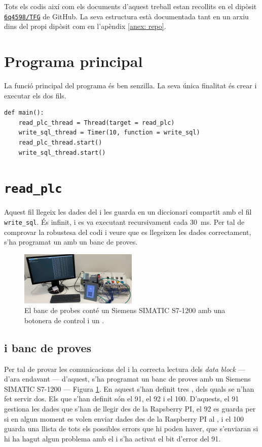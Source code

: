 \documentclass{tfgitic}[2022/06/30]
\begin{document}
Tots els codis així com els documents d'aquest treball estan recollits en el dipòsit \texttt{\href{https://github.com/6q4598/TFG}{6q4598/TFG}} de GitHub. La seva estructura està documentada tant en un arxiu  dins del propi dipòsit com en l'apèndix \ref{anex: repo}.

\section{Programa principal}
La funció principal del programa és ben senzilla. La seva única finalitat és crear i executar els dos fils.

\begin{lstlisting}[style=Python]
def main():
    read_plc_thread = Thread(target = read_plc)
    write_sql_thread = Timer(10, function = write_sql)
    read_plc_thread.start()
    write_sql_thread.start()
\end{lstlisting}

\section{\texttt{read\_plc}}
Aquest fil llegeix les dades del  i les guarda en un diccionari compartit amb el fil \texttt{write\_sql}. És infinit, i es va executant recursivament cada \SI{30}{\ms}. Per tal de comprovar la robustesa del codi i veure que es llegeixen les dades correctament, s'ha programat un  amb un banc de proves.

\begin{figure}[h]
\centering
\includegraphics[width=0.5\textwidth]{img/bancProves.jpg}
\caption{El banc de probes conté un  Siemens SIMATIC S7-1200 amb una botonera de control i un .}
\label{s71200}
\end{figure}

\subsection{ i banc de proves}
Per tal de provar les comunicacions del  i la correcta lectura dels \emph{data block} --- d'ara endavant  --- d'aquest, s'ha programat un banc de proves amb un  Siemens SIMATIC S7-1200 --- Figura \ref{s71200}. En aquest  s'han definit tres , dels quals se n'han fet servir dos. Els  que s'han definit són el 91, el 92 i el 100. D'aquests, el 91 gestiona les dades que s'han de llegir des de la Rapsberry PI, el 92 es guarda per si en algun moment es volen enviar dades des de la Raspberry PI al , i el 100 guarda una llista de tots els possibles errors que hi poden haver, que s'enviaran si hi ha hagut algun problema amb el  i s'ha activat el bit d'error del  91.
\end{document}
